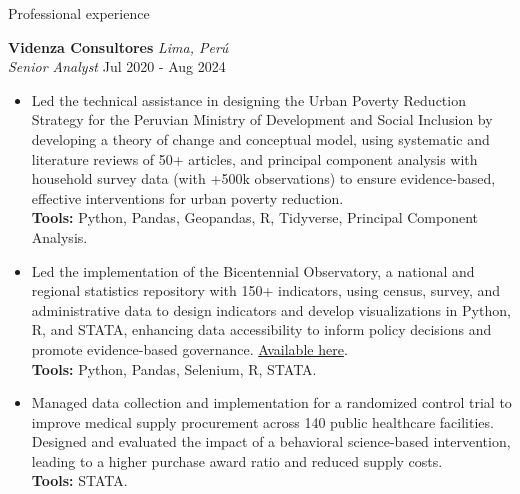 \documentclass{resume} %
\begin{document}
\begin{rSection}{Professional experience}

\textbf{Videnza Consultores} \hfill \textit{Lima, Perú} \\
\textit{Senior Analyst}  \hfill Jul 2020 - Aug 2024
 \begin{itemize}
    \itemsep -3pt {} 
      \item Led the technical assistance in designing the Urban Poverty Reduction Strategy for the Peruvian Ministry of Development and Social Inclusion by developing a theory of change and conceptual model, using systematic and literature reviews of 50+ articles, and principal component analysis with household survey data (with +500k observations) to ensure evidence-based, effective interventions for urban poverty reduction. \\ \textbf{Tools:} Python, Pandas, Geopandas, R, Tidyverse, Principal Component Analysis. 
      \item Led the implementation of the Bicentennial Observatory, a national and regional statistics repository with 150+ indicators, using census, survey, and administrative data to design indicators and develop visualizations in Python, R, and STATA, enhancing data accessibility to inform policy decisions and promote evidence-based governance. \href{https://propuestasdelbicentenario.pe/observatorio/}{Available here}. \\ \textbf{Tools:} Python, Pandas, Selenium, R, STATA. 
      \item Managed data collection and implementation for a randomized control trial to improve medical supply procurement across 140 public healthcare facilities. Designed and evaluated the impact of a behavioral science-based intervention, leading to a higher purchase award ratio and reduced supply costs. \\ \textbf{Tools:} STATA. 
   \end{itemize}
 

\end{rSection}
\end{document}
